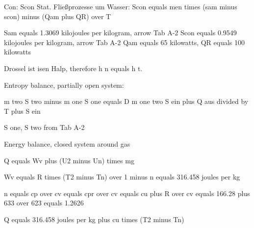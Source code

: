 Con: Scon  
Stat. Fließprozesse um Wasser:  
Scon equals men times (sam minus scon) minus (Qam plus QR) over T  

Sam equals 1.3069 kilojoules per kilogram, arrow Tab A-2  
Scon equals 0.9549 kilojoules per kilogram, arrow Tab A-2  
Qam equals 65 kilowatts, QR equals 100 kilowatts

Drossel ist isen Halp, therefore h n equals h t.

Entropy balance, partially open system:

m two S two minus m one S one equals D m one two S ein plus Q aus divided by T plus S ein

S one, S two from Tab A-2

Energy balance, closed system around gas

Q equals Wv plus (U2 minus Un) times mg

Wv equals R times (T2 minus Tn) over 1 minus n equals 316.458 joules per kg

n equals cp over cv equals cpr over cv equals cu plus R over cv equals 166.28 plus 633 over 623 equals 1.2626

Q equals 316.458 joules per kg plus cu times (T2 minus Tn)